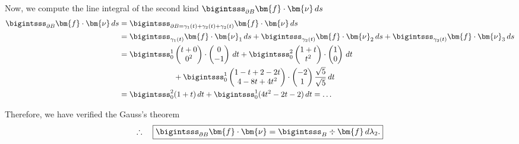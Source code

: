\documentclass[12pt]{article}
\begin{document}
\begin{enumerate}[(i)]
	      Now, we compute the line integral of the second kind
	      $\bigintsss_{\partial B} \bm{f}\cdot \bm{\nu} \, ds$
	      \begin{align}
		      \bigintsss_{\partial B} \bm{f}\cdot\bm{\nu} \, ds
		       & =
		      \bigintsss_{\partial B = \gamma_1(t) + \gamma_2(t) + \gamma_3(t)} \bm{f}\cdot\bm{\nu} \, ds
		      \\
		       & =
		      \bigintsss_{\gamma_1(t)} \bm{f}\cdot\bm{\nu}_1 \, ds +
		      \bigintsss_{\gamma_2(t)} \bm{f}\cdot\bm{\nu}_2 \, ds +
		      \bigintsss_{\gamma_3(t)} \bm{f}\cdot\bm{\nu}_3 \, ds                                  \\
		       & =\bigintsss_0^1
		      \begin{pmatrix}t+0 \\0^2 \end{pmatrix} \cdot \begin{pmatrix}0 \\-1 \end{pmatrix} \, dt
		      + \bigintsss_0^2
		      \begin{pmatrix}1+t \\t^2 \end{pmatrix} \cdot \begin{pmatrix}1 \\0 \end{pmatrix} \, dt \\
		       & \quad\quad\quad\quad\quad\quad\quad
		      + \bigintsss_0^1
		      \begin{pmatrix}1-t+2-2t \\ 4-8t+4t^2\end{pmatrix} \cdot \begin{pmatrix}-2\\1\end{pmatrix}
		      \frac{\sqrt{5}}{\sqrt{5}} \, dt                                                       \\
		       & =\bigintsss_0^2 (1+t) \, dt
		      + \bigintsss_0^1 (4t^2-2t-2) \, dt
		      = \dots
	      \end{align}
\end{enumerate}


Therefore, we have verified the Gauss's theorem
\begin{align}
	\therefore\quad
	\boxed{
		\bigintsss_{\partial B} \bm{f} \cdot \bm{\nu}
		= \bigintsss_B \div \bm{f} \, d\lambda_2.
	}
\end{align}



% 
\end{document}
